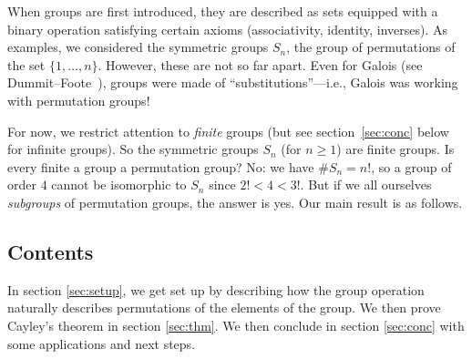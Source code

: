 When groups are first introduced, they are described as sets equipped with a binary operation
satisfying certain axioms (associativity, identity, inverses).
As examples, we considered the symmetric groups $S_n$, the group of permutations of the set
$\{1,\dots,n\}$.  However, these are not so far apart.  Even for Galois (see 
Dummit--Foote~\cite[p.~14 (3)]{DummitFoote}), groups were made of ``substitutions''---i.e., 
Galois was working with permutation groups!  

For now, we restrict attention to \emph{finite} groups (but see section~\ref{sec:conc} below 
for infinite groups).  So the symmetric groups $S_n$ (for $n \geq 1$) are finite groups.  Is 
every finite a group a permutation group?  No: we have $\#S_n=n!$, so a group of order $4$ 
cannot be isomorphic to $S_n$ since $2! < 4 < 3!$.  But if we all ourselves \emph{subgroups} 
of permutation groups, the answer is yes.  Our main result is as follows.


\subsection*{Contents} In section \ref{sec:setup}, we get set up by describing how the group 
operation naturally describes permutations of the elements of the group.  We then prove 
Cayley's theorem in section \ref{sec:thm}.  We then conclude in section \ref{sec:conc} with 
some applications and next steps.
